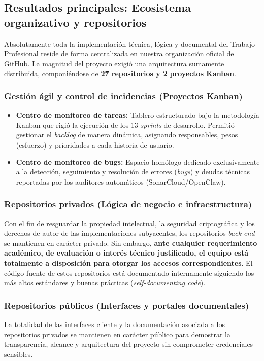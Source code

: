\documentclass[conference, a4paper]{IEEEtran}
\begin{document}
\subsection{Resultados principales: Ecosistema organizativo y repositorios}
Absolutamente toda la implementaci\'on t\'ecnica, l\'ogica y documental del Trabajo Profesional reside de forma centralizada en nuestra organizaci\'on oficial de GitHub. La magnitud del proyecto exigi\'o una arquitectura sumamente distribuida, componi\'endose de \textbf{27 repositorios y 2 proyectos Kanban}.

\subsubsection{Gesti\'on \'agil y control de incidencias (Proyectos Kanban)}
\begin{itemize}
    \item \textbf{Centro de monitoreo de tareas:} Tablero estructurado bajo la metodolog\'ia Kanban que rigi\'o la ejecuci\'on de los 13 \textit{sprints} de desarrollo. Permiti\'o gestionar el \textit{backlog} de manera din\'amica, asignando responsables, pesos (esfuerzo) y prioridades a cada historia de usuario.
    \item \textbf{Centro de monitoreo de bugs:} Espacio hom\'ologo dedicado exclusivamente a la detecci\'on, seguimiento y resoluci\'on de errores (\textit{bugs}) y deudas t\'ecnicas reportadas por los auditores autom\'aticos (SonarCloud/OpenClaw).
\end{itemize}

\subsubsection{Repositorios privados (L\'ogica de negocio e infraestructura)}
Con el fin de resguardar la propiedad intelectual, la seguridad criptogr\'afica y los derechos de autor de las implementaciones subyacentes, los repositorios \textit{back-end} se mantienen en car\'acter privado. Sin embargo, \textbf{ante cualquier requerimiento acad\'emico, de evaluaci\'on o inter\'es t\'ecnico justificado, el equipo est\'a totalmente a disposici\'on para otorgar los accesos correspondientes}. El c\'odigo fuente de estos repositorios est\'a documentado internamente siguiendo los m\'as altos est\'andares y buenas pr\'acticas (\textit{self-documenting code}).

\subsubsection{Repositorios p\'ublicos (Interfaces y portales documentales)}
La totalidad de las interfaces cliente y la documentaci\'on asociada a los repositorios privados se mantienen en car\'acter p\'ublico para demostrar la transparencia, alcance y arquitectura del proyecto sin comprometer credenciales sensibles.
\end{document}
